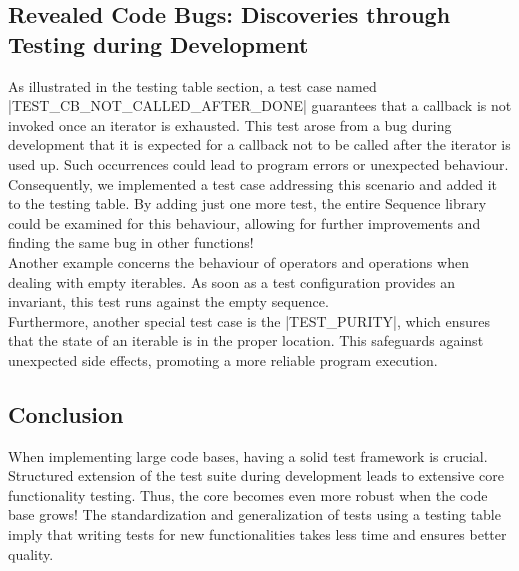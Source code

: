 \subsection{Revealed Code Bugs: Discoveries through Testing during Development}
\label{sub:Revealed Code Bugs: Discoveries through Testing during Development}
As illustrated in the testing table section, a test case named
|TEST_CB_NOT_CALLED_AFTER_DONE| guarantees that a callback is not invoked once
an iterator is exhausted. This test arose from a bug during development
that it is expected for a callback not to be called after the iterator is used
up. Such occurrences could lead to program errors or unexpected behaviour.
Consequently, we implemented a test case addressing this scenario and added it
to the testing table. By adding just one more test, the entire Sequence library
could be examined for this behaviour, allowing for further improvements and
finding the same bug in other functions!
\\
Another example concerns the behaviour of operators and operations when dealing
with empty iterables. As soon as a test configuration provides an invariant,
this test runs against the empty sequence.\\
Furthermore, another special test case is the |TEST_PURITY|, which ensures that
the state of an iterable is in the proper location. This safeguards against
unexpected side effects, promoting a more reliable program execution.

\subsection{Conclusion}
\label{sub:Conclusion}
When implementing large code bases, having a solid test framework is crucial.
Structured extension of the test suite during development leads to extensive
core functionality testing. Thus, the core becomes even more robust when the
code base grows!
\newline
The standardization and generalization of tests using a testing table imply that
writing tests for new functionalities takes less time and ensures better
quality.
